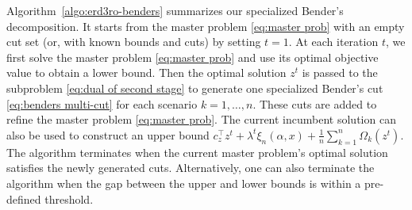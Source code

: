 \documentclass[onefignum,onetabnum]{siamart251216}
\begin{document}
Algorithm\ \ref{algo:erd3ro-benders} summarizes our specialized Bender's decomposition. It starts from the master problem \eqref{eq:master prob} with an empty cut set (or, with known bounds and cuts) by setting $t=1$. 
At each iteration $t$, we first solve the master problem \eqref{eq:master prob} and use its optimal objective value to obtain a lower bound. Then the optimal solution $z^t$ is passed to the subproblem \eqref{eq:dual of second stage} to generate one specialized Bender's cut \eqref{eq:benders multi-cut} for each scenario $k=1,\ldots,n$. These cuts are added to refine the master problem \eqref{eq:master prob}. The current incumbent solution can also be used to construct an upper bound $c_z^\top z^t + \lambda^t \xi_n(\alpha,x) + \frac{1}{n} \sum_{k=1}^n\Omega_k(z^t)$. The algorithm terminates when the current master problem's optimal solution satisfies the newly generated cuts.
Alternatively, one can also terminate the algorithm when the gap between the upper and lower bounds is within a pre-defined threshold.
\end{document}
